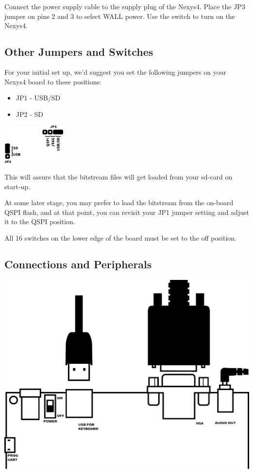 Connect the power supply cable to the supply plug of the Nexys4. Place the JP3 jumper on pins 2 and 3 to select WALL power. Use the switch to turn on the Nexys4.

\subsection{Other Jumpers and Switches}

For your initial set up, we'd suggest you set the following jumpers on your Nexys4 board to these positions:

\begin{itemize}
  \item{JP1} - USB/SD
  \item{JP2} - SD
\end{itemize}

\begin{center}
  \includegraphics[width=3.2cm]{images/illustrations/nexys-jumpers.pdf}
\end{center}

This will assure that the bitstream files will get loaded from your sd-card on start-up.

At some later stage, you may prefer to load the bitstream from the on-board QSPI flash, and at that point, you can revisit your JP1 jumper setting and adjust it to the QSPI position.


All 16 switches on the lower edge of the board must be set to the off position.


\subsection{Connections and Peripherals}

\includegraphics[width=\linewidth]{images/illustrations/nexys-connectors.pdf}

